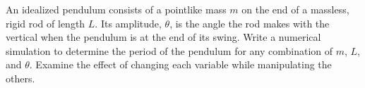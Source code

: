 An idealized pendulum consists of a pointlike mass $m$ on the end of a massless,
        rigid rod of length $L$. Its amplitude, $\theta$, is the angle the rod makes with the
        vertical when the pendulum is at the end of its swing. Write a numerical simulation
        to determine the period of the pendulum for any combination of $m$, $L$, and
        $\theta$. Examine the effect of changing each variable while manipulating the
        others.
